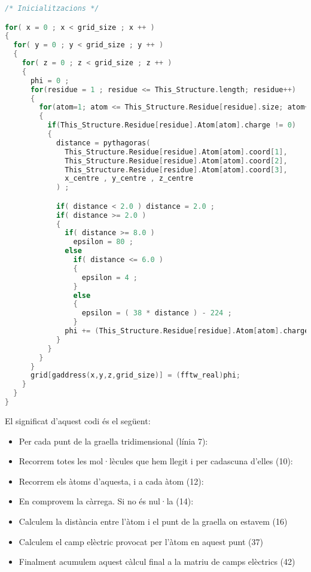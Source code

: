 \begin{lstlisting}[label=ef0, caption=Codi original d'electric\_field, language=C]
/* Inicialitzacions */

for( x = 0 ; x < grid_size ; x ++ )
{
  for( y = 0 ; y < grid_size ; y ++ )
  {
    for( z = 0 ; z < grid_size ; z ++ )
    {
      phi = 0 ;
      for(residue = 1 ; residue <= This_Structure.length; residue++)
      {
        for(atom=1; atom <= This_Structure.Residue[residue].size; atom++)
        {
          if(This_Structure.Residue[residue].Atom[atom].charge != 0)
          {
            distance = pythagoras(
              This_Structure.Residue[residue].Atom[atom].coord[1],
              This_Structure.Residue[residue].Atom[atom].coord[2],
              This_Structure.Residue[residue].Atom[atom].coord[3],
              x_centre , y_centre , z_centre
            ) ;

            if( distance < 2.0 ) distance = 2.0 ;
            if( distance >= 2.0 )
            {
              if( distance >= 8.0 )
                epsilon = 80 ;
              else
                if( distance <= 6.0 )
                {
                  epsilon = 4 ;
                }
                else
                {
                  epsilon = ( 38 * distance ) - 224 ;
                }
              phi += (This_Structure.Residue[residue].Atom[atom].charge / (epsilon * distance));
            }
          }
        }
      }
      grid[gaddress(x,y,z,grid_size)] = (fftw_real)phi;
    }
  }
}
\end{lstlisting}

El significat d'aquest codi és el següent:

\begin{itemize}
  \item Per cada punt de la graella tridimensional (línia 7):
  \item Recorrem totes les mol·lècules que hem llegit i per cadascuna d'elles (10):
  \item Recorrem els àtoms d'aquesta, i a cada àtom (12):
  \item En comprovem la càrrega. Si no és nul·la (14):
  \item Calculem la distància entre l'àtom i el punt de la graella on estavem (16)
  \item Calculem el camp elèctric provocat per l'àtom en aquest punt (37)
  \item Finalment acumulem aquest càlcul final a la matriu de camps elèctrics (42)
\end{itemize}

